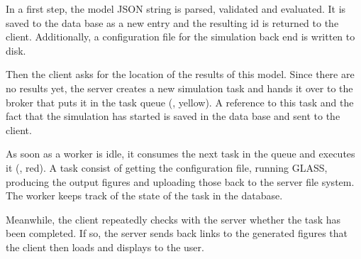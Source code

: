 
In a first step, the model JSON string is parsed, validated and evaluated.
It is saved to the data base as a new entry and the resulting id is returned to the client.
Additionally, a configuration file for the simulation back end is written to disk. 

Then the client asks for the location of the results of this model.
Since there are no results yet, the server creates a new simulation task and hands it over to the broker that puts it in the task queue (, yellow).
A reference to this task and the fact that the simulation has started is saved in the data base and sent to the client.

As soon as a worker is idle, it consumes the next task in the queue and executes it (, red).
A task consist of getting the configuration file, running GLASS, producing the output figures and uploading those back to the server file system.
The worker keeps track of the state of the task in the database.

Meanwhile, the client repeatedly checks with the server whether the task has been completed.
If so, the server sends back links to the generated figures that the client then loads and displays to the user.








